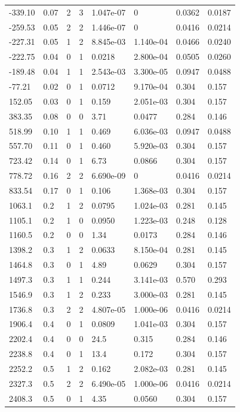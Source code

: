 \documentclass[preview]{standalone}
\begin{document}
{{\begin{tabular}{L{1.2cm}C{1.2cm} C{0.3cm}C{0.5cm} C{1.4cm}C{1.4cm} C{1.4cm}C{1.4cm}}
  -339.10  &  0.07  & 2     &  3 &  1.047e-07  & 0  & 0.0362 &  0.0187   \\ 
  -259.53  &  0.05  & 2     &  2 &  1.446e-07  & 0  & 0.0416 &  0.0214   \\ 
  -227.31  &  0.05  & 1     &  2 &  8.845e-03  & 1.140e-04  & 0.0466 &  0.0240   \\ 
  -222.75  &  0.04  & 0     &  1 &  0.0218  & 2.800e-04  & 0.0505 &  0.0260   \\ 
  -189.48  &  0.04  & 1     &  1 &  2.543e-03  & 3.300e-05  & 0.0947 &  0.0488   \\ 
  -77.21  &  0.02  & 0     &  1 &  0.0712  & 9.170e-04  & 0.304 &  0.157   \\ 
  152.05  &  0.03  & 0     &  1 &  0.159  & 2.051e-03  & 0.304 &  0.157   \\ 
  383.35  &  0.08  & 0     &  0 &  3.71  & 0.0477  & 0.284 &  0.146   \\ 
  518.99  &  0.10  & 1     &  1 &  0.469  & 6.036e-03  & 0.0947 &  0.0488   \\ 
  557.70  &  0.11  & 0     &  1 &  0.460  & 5.920e-03  & 0.304 &  0.157   \\ 
  723.42  &  0.14  & 0     &  1 &  6.73  & 0.0866  & 0.304 &  0.157   \\ 
  778.72  &  0.16  & 2     &  2 &  6.690e-09  & 0  & 0.0416 &  0.0214   \\ 
  833.54  &  0.17  & 0     &  1 &  0.106  & 1.368e-03  & 0.304 &  0.157   \\ 
  1063.1  &   0.2  & 1     &  2 &  0.0795  & 1.024e-03  & 0.281 &  0.145   \\ 
  1105.1  &   0.2  & 1     &  0 &  0.0950  & 1.223e-03  & 0.248 &  0.128   \\ 
  1160.5  &   0.2  & 0     &  0 &  1.34  & 0.0173  & 0.284 &  0.146   \\ 
  1398.2  &   0.3  & 1     &  2 &  0.0633  & 8.150e-04  & 0.281 &  0.145   \\ 
  1464.8  &   0.3  & 0     &  1 &  4.89  & 0.0629  & 0.304 &  0.157   \\ 
  1497.3  &   0.3  & 1     &  1 &  0.244  & 3.141e-03  & 0.570 &  0.293   \\ 
  1546.9  &   0.3  & 1     &  2 &  0.233  & 3.000e-03  & 0.281 &  0.145   \\ 
  1736.8  &   0.3  & 2     &  2 &  4.807e-05  & 1.000e-06  & 0.0416 &  0.0214   \\ 
  1906.4  &   0.4  & 0     &  1 &  0.0809  & 1.041e-03  & 0.304 &  0.157   \\ 
  2202.4  &   0.4  & 0     &  0 &  24.5  & 0.315  & 0.284 &  0.146   \\ 
  2238.8  &   0.4  & 0     &  1 &  13.4  & 0.172  & 0.304 &  0.157   \\ 
  2252.2  &   0.5  & 1     &  2 &  0.162  & 2.082e-03  & 0.281 &  0.145   \\ 
  2327.3  &   0.5  & 2     &  2 &  6.490e-05  & 1.000e-06  & 0.0416 &  0.0214   \\ 
  2408.3  &   0.5  & 0     &  1 &  4.35  & 0.0560  & 0.304 &  0.157   \\ 
\hline 
\end{tabular} 

}}
\end{document}
